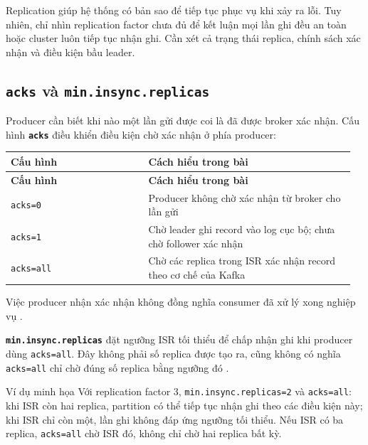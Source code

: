 Replication giúp hệ thống có bản sao để tiếp tục phục vụ khi xảy ra lỗi. Tuy nhiên, chỉ nhìn replication factor chưa đủ để kết luận mọi lần ghi đều an toàn hoặc cluster luôn tiếp tục nhận ghi. Cần xét cả trạng thái replica, chính sách xác nhận và điều kiện bầu leader.


\FloatBarrier
{}
\subsection{\texorpdfstring{\texttt{acks} và \texttt{min.insync.replicas}}{acks và min.insync.replicas}}

Producer cần biết khi nào một lần gửi được coi là đã được broker xác nhận. Cấu hình \textbf{\texttt{acks}} điều khiển điều kiện chờ xác nhận ở phía producer:


\begingroup\small
\renewcommand{\arraystretch}{1.23}
\begin{longtable}{@{}p{0.38\linewidth}p{0.58\linewidth}@{}}
\toprule
\rowcolor{rowLavender}
\textbf{Cấu hình} & \textbf{Cách hiểu trong bài} \\
\midrule
\endfirsthead
\toprule
\rowcolor{rowLavender}
\textbf{Cấu hình} & \textbf{Cách hiểu trong bài} \\
\midrule
\endhead
\bottomrule
\endfoot
\texttt{acks=\allowbreak{}0} & Producer không chờ xác nhận từ broker cho lần gửi \\
\texttt{acks=\allowbreak{}1} & Chờ leader ghi record vào log cục bộ; chưa chờ follower xác nhận \\
\texttt{acks=\allowbreak{}all} & Chờ các replica trong ISR xác nhận record theo cơ chế của Kafka \\
\end{longtable}
\endgroup

Việc producer nhận xác nhận không đồng nghĩa consumer đã xử lý xong nghiệp vụ \cite{kafka-producer-configs}.


\textbf{\texttt{min.\allowbreak{}insync.\allowbreak{}replicas}} đặt ngưỡng ISR tối thiểu để chấp nhận ghi khi producer dùng \texttt{acks=\allowbreak{}all}. Đây không phải số replica được tạo ra, cũng không có nghĩa \texttt{acks=\allowbreak{}all} chỉ chờ đúng số replica bằng ngưỡng đó \cite{kafka-topic-configs}.


\begin{examplebox}{Ví dụ minh họa}
Với replication factor 3, \texttt{min.\allowbreak{}insync.\allowbreak{}replicas=\allowbreak{}2} và \texttt{acks=\allowbreak{}all}: khi ISR còn hai replica, partition có thể tiếp tục nhận ghi theo các điều kiện này; khi ISR chỉ còn một, lần ghi không đáp ứng ngưỡng tối thiểu. Nếu ISR có ba replica, \texttt{acks=\allowbreak{}all} chờ ISR đó, không chỉ chờ hai replica bất kỳ.
\end{examplebox}


